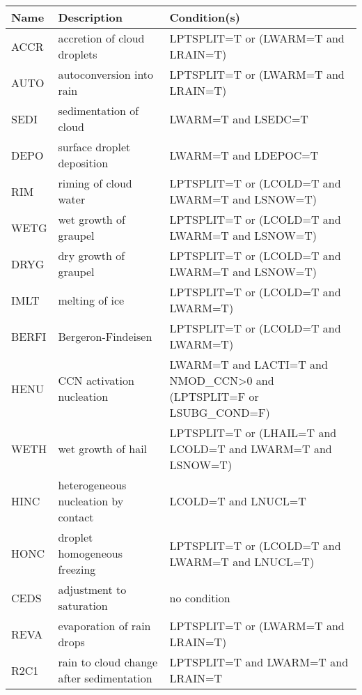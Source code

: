 \begin{longtable} {|p{}|p{}|p{}|}
\hline
Name & Description & Condition(s) \\
\hline \hline
\endhead
ACCR   & accretion of cloud droplets                              & LPTSPLIT=T or (LWARM=T and LRAIN=T) \\\hline
AUTO   & autoconversion into rain                                 & LPTSPLIT=T or (LWARM=T and LRAIN=T) \\\hline
SEDI   & sedimentation of cloud                                   & LWARM=T and LSEDC=T \\\hline
DEPO   & surface droplet deposition                               & LWARM=T and LDEPOC=T \\\hline
RIM    & riming of cloud water                                    & LPTSPLIT=T or (LCOLD=T and LWARM=T and LSNOW=T) \\\hline
WETG   & wet growth of graupel                                    & LPTSPLIT=T or (LCOLD=T and LWARM=T and LSNOW=T) \\\hline
DRYG   & dry growth of graupel                                    & LPTSPLIT=T or (LCOLD=T and LWARM=T and LSNOW=T) \\\hline
IMLT   & melting of ice                                           & LPTSPLIT=T or (LCOLD=T and LWARM=T) \\\hline
BERFI  & Bergeron-Findeisen                                       & LPTSPLIT=T or (LCOLD=T and LWARM=T) \\\hline
HENU   & CCN activation nucleation                                & LWARM=T and LACTI=T and NMOD\_CCN>0 and (LPTSPLIT=F or LSUBG\_COND=F) \\\hline
WETH   & wet growth of hail                                       & LPTSPLIT=T or (LHAIL=T and LCOLD=T and LWARM=T and LSNOW=T) \\\hline
HINC   & heterogeneous nucleation by contact                      & LCOLD=T and LNUCL=T \\\hline
HONC   & droplet homogeneous freezing                             & LPTSPLIT=T or (LCOLD=T and LWARM=T and LNUCL=T) \\\hline
CEDS   & adjustment to saturation                                 & no condition \\\hline
REVA   & evaporation of rain drops                                & LPTSPLIT=T or (LWARM=T and LRAIN=T) \\\hline
R2C1   & rain to cloud change after sedimentation                 & LPTSPLIT=T and LWARM=T and LRAIN=T \\\hline

\end{longtable}
